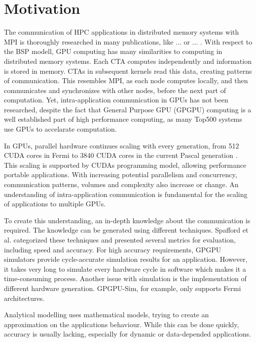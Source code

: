 \chapter{Motivation}
The communication of HPC applications in distributed memory systems with MPI is thoroughly researched in many publications, like ... or ... .
With respect to the BSP modell, GPU computing has many similarities to computing in distributed memory systems. Each CTA computes independently and information is stored in memory. CTAs in subsequent kernels read this data, creating patterns of communication. This resembles MPI, as each node computes locally, and then communicates and synchronizes with other nodes, before the next part of computation.
Yet, intra-application communication in GPUs has not been researched, despite the fact that General Purpose GPU (GPGPU) computing is a well established part of high performance computing, as many Top500 
systems \cite{Top500} use GPUs to accelarate computation. 

In GPUs, parallel hardware continues scaling with every generation, from 512 CUDA cores in Fermi  \cite{FermiPaper} to 3840 CUDA cores in the current Pascal generation \cite{PascalPaper}. This scaling is supported by CUDAs programming model, allowing performance portable applications. With increasing potential parallelism and concurrency, communication patterns, volumes and complexity also increase or change.
An understanding of intra-application communication is fundamental for the scaling of applications to multiple
GPUs.

To create this understanding, an in-depth knowledge about the communication is required. The knowledge can be generated
using different techniques.
Spafford et al. \cite{Spafford:2012:ADS:2388996.2389110} categorized these techniques and presented several 
metrics for evaluation, including speed and accuracy. For high accuracy requirements, GPGPU simulators provide cycle-accurate simulation results for an application. However, it takes very long to simulate every hardware cycle in software which makes it a time-consuming process. 
Another issue with simulation is the implementation of different hardware generation. GPGPU-Sim, for example, only supports Fermi architectures. \cite{gpgpu}

Analytical modelling uses mathematical models, trying to create an approximation on the applications behaviour.
While this can be done quickly, accuracy is usually lacking, especially for dynamic or data-depended applications.

